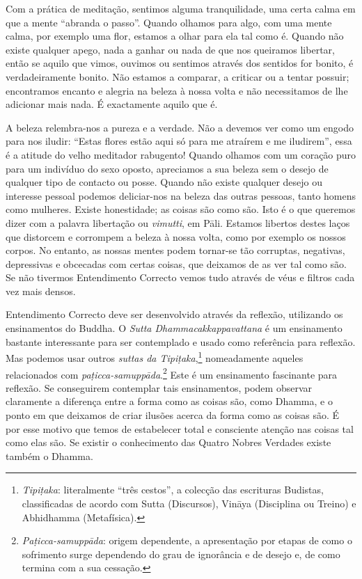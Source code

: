 \sectionBreak

Com a prática de meditação, sentimos alguma tranquilidade, uma certa calma em
que a mente “abranda o passo”. Quando olhamos para algo, com uma mente calma,
por exemplo uma flor, estamos a olhar para ela tal como é. Quando não existe
qualquer apego, nada a ganhar ou nada de que nos queiramos libertar, então se
aquilo que vimos, ouvimos ou sentimos através dos sentidos for bonito, é
verdadeiramente bonito. Não estamos a comparar, a criticar ou a tentar possuir;
encontramos encanto e alegria na beleza à nossa volta e não necessitamos de lhe
adicionar mais nada. É exactamente aquilo que é.

A beleza relembra-nos a pureza e a verdade. Não a devemos ver como um engodo
para nos iludir: “Estas flores estão aqui só para me atraírem e me iludirem”,
essa é a atitude do velho meditador rabugento! Quando olhamos com um coração
puro para um indivíduo do sexo oposto, apreciamos a sua beleza sem o desejo de
qualquer tipo de contacto ou posse. Quando não existe qualquer desejo ou
interesse pessoal podemos deliciar-nos na beleza das outras pessoas, tanto
homens como mulheres. Existe honestidade; as coisas são como são. Isto é o que
queremos dizer com a palavra libertação ou \emph{vimutti}, em Pāli. Estamos
libertos destes laços que distorcem e corrompem a beleza à nossa volta, como por
exemplo os nossos corpos. No entanto, as nossas mentes podem tornar-se tão
corruptas, negativas, depressivas e obcecadas com certas coisas, que deixamos de
as ver tal como são. Se não tivermos Entendimento Correcto vemos tudo através de
véus e filtros cada vez mais densos.

Entendimento Correcto deve ser desenvolvido através da reflexão, utilizando os
ensinamentos do Buddha. O \emph{Sutta Dhammacakkappavattana} é um ensinamento
bastante interessante para ser contemplado e usado como referência para
reflexão. Mas podemos usar outros \emph{suttas da Tipiṭaka},\footnote{%
  \emph{Tipiṭaka}: literalmente “três cestos”, a colecção das escrituras
  Budistas, classificadas de acordo com Sutta (Discursos), Vināya (Disciplina ou
  Treino) e Abhidhamma (Metafísica).} nomeadamente aqueles relacionados com
\emph{paṭicca-samuppāda}.\footnote{%
  \emph{Paṭicca-samuppāda}: origem dependente, a apresentação por etapas de como
  o sofrimento surge dependendo do grau de ignorância e de desejo e, de como
  termina com a sua cessação.} Este é um ensinamento fascinante para reflexão.
Se conseguirem contemplar tais ensinamentos, podem observar claramente a
diferença entre a forma como as coisas são, como Dhamma, e o ponto em que
deixamos de criar ilusões acerca da forma como as coisas são. É por esse motivo
que temos de estabelecer total e consciente atenção nas coisas tal como elas
são. Se existir o conhecimento das Quatro Nobres Verdades existe também o
Dhamma.

